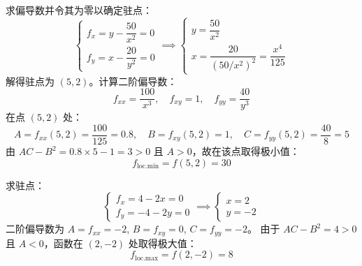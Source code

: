 \begin{solution}
    求偏导数并令其为零以确定驻点：
    \begin{equation}
        \begin{cases}
            f_x = y - \dfrac{50}{x^2} = 0 \\
            f_y = x - \dfrac{20}{y^2} = 0
        \end{cases} \implies
        \begin{cases}
            y = \dfrac{50}{x^2} \\
            x = \dfrac{20}{(50/x^2)^2} = \dfrac{x^4}{125}
        \end{cases}
    \end{equation}
    解得驻点为 $(5, 2)$。计算二阶偏导数：
    \begin{equation}
        f_{xx} = \frac{100}{x^3}, \quad f_{xy} = 1, \quad f_{yy} = \frac{40}{y^3}
    \end{equation}
    在点 $(5, 2)$ 处：
    \begin{equation}
        A = f_{xx}(5, 2) = \frac{100}{125} = 0.8, \quad B = f_{xy}(5, 2) = 1, \quad C = f_{yy}(5, 2) = \frac{40}{8} = 5
    \end{equation}
    由 $AC - B^2 = 0.8 \times 5 - 1 = 3 > 0$ 且 $A > 0$，故在该点取得极小值：
    \begin{equation}
        \boxed{f_{\text{loc.min}} = f(5, 2) = 30}
    \end{equation}

    求驻点：
    \begin{equation}
        \begin{cases}
            f_x = 4 - 2x = 0 \\
            f_y = -4 - 2y = 0
        \end{cases} \implies
        \begin{cases}
            x = 2 \\
            y = -2
        \end{cases}
    \end{equation}
    二阶偏导数为 $A = f_{xx} = -2$, $B = f_{xy} = 0$, $C = f_{yy} = -2$。
    由于 $AC - B^2 = 4 > 0$ 且 $A < 0$，函数在 $(2, -2)$ 处取得极大值：
    \begin{equation}
        \boxed{f_{\text{loc.max}} = f(2, -2) = 8}
    \end{equation}


\end{solution}
